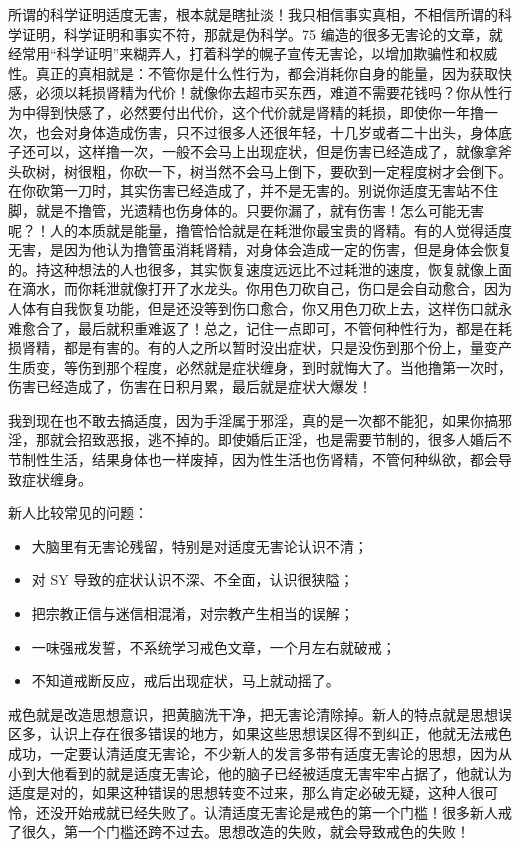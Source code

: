 \begin{case}
    所谓的科学证明适度无害，根本就是瞎扯淡！我只相信事实真相，不相信所谓的科学证明，科学证明和事实不符，那就是伪科学。75 编造的很多无害论的文章，就经常用“科学证明”来糊弄人，打着科学的幌子宣传无害论，以增加欺骗性和权威性。真正的真相就是：不管你是什么性行为，都会消耗你自身的能量，因为获取快感，必须以耗损肾精为代价！就像你去超市买东西，难道不需要花钱吗？你从性行为中得到快感了，必然要付出代价，这个代价就是肾精的耗损，即使你一年撸一次，也会对身体造成伤害，只不过很多人还很年轻，十几岁或者二十出头，身体底子还可以，这样撸一次，一般不会马上出现症状，但是伤害已经造成了，就像拿斧头砍树，树很粗，你砍一下，树当然不会马上倒下，要砍到一定程度树才会倒下。在你砍第一刀时，其实伤害已经造成了，并不是无害的。别说你适度无害站不住脚，就是不撸管，光遗精也伤身体的。只要你漏了，就有伤害！怎么可能无害呢？！人的本质就是能量，撸管恰恰就是在耗泄你最宝贵的肾精。有的人觉得适度无害，是因为他认为撸管虽消耗肾精，对身体会造成一定的伤害，但是身体会恢复的。持这种想法的人也很多，其实恢复速度远远比不过耗泄的速度，恢复就像上面在滴水，而你耗泄就像打开了水龙头。你用色刀砍自己，伤口是会自动愈合，因为人体有自我恢复功能，但是还没等到伤口愈合，你又用色刀砍上去，这样伤口就永难愈合了，最后就积重难返了！总之，记住一点即可，不管何种性行为，都是在耗损肾精，都是有害的。有的人之所以暂时没出症状，只是没伤到那个份上，量变产生质变，等伤到那个程度，必然就是症状缠身，到时就悔大了。当他撸第一次时，伤害已经造成了，伤害在日积月累，最后就是症状大爆发！

    我到现在也不敢去搞适度，因为手淫属于邪淫，真的是一次都不能犯，如果你搞邪淫，那就会招致恶报，逃不掉的。即使婚后正淫，也是需要节制的，很多人婚后不节制性生活，结果身体也一样废掉，因为性生活也伤肾精，不管何种纵欲，都会导致症状缠身。

    新人比较常见的问题：

    \begin{itemize}
        \item 大脑里有无害论残留，特别是对适度无害论认识不清；
        \item 对 SY 导致的症状认识不深、不全面，认识很狭隘；
        \item 把宗教正信与迷信相混淆，对宗教产生相当的误解；
        \item 一味强戒发誓，不系统学习戒色文章，一个月左右就破戒；
        \item 不知道戒断反应，戒后出现症状，马上就动摇了。
    \end{itemize}

    戒色就是改造思想意识，把黄脑洗干净，把无害论清除掉。新人的特点就是思想误区多，认识上存在很多错误的地方，如果这些思想误区得不到纠正，他就无法戒色成功，一定要认清适度无害论，不少新人的发言多带有适度无害论的思想，因为从小到大他看到的就是适度无害论，他的脑子已经被适度无害牢牢占据了，他就认为适度是对的，如果这种错误的思想转变不过来，那么肯定必破无疑，这种人很可怜，还没开始戒就已经失败了。认清适度无害论是戒色的第一个门槛！很多新人戒了很久，第一个门槛还跨不过去。思想改造的失败，就会导致戒色的失败！
\end{case}

